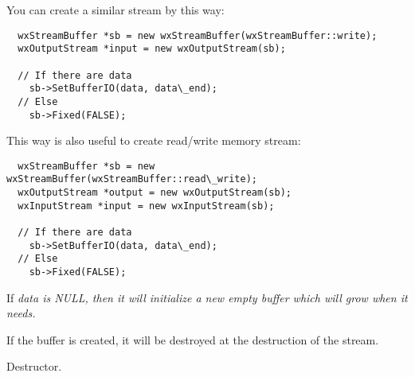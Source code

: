 
You can create a similar stream by this way:
\begin{verbatim}
  wxStreamBuffer *sb = new wxStreamBuffer(wxStreamBuffer::write);
  wxOutputStream *input = new wxOutputStream(sb);

  // If there are data
    sb->SetBufferIO(data, data\_end);
  // Else
    sb->Fixed(FALSE);
\end{verbatim}

This way is also useful to create read/write memory stream:
\begin{verbatim}
  wxStreamBuffer *sb = new wxStreamBuffer(wxStreamBuffer::read\_write);
  wxOutputStream *output = new wxOutputStream(sb);
  wxInputStream *input = new wxInputStream(sb);

  // If there are data
    sb->SetBufferIO(data, data\_end);
  // Else
    sb->Fixed(FALSE);
\end{verbatim}




If \it{data} is NULL, then it will initialize a new empty buffer which will
grow when it needs.


If the buffer is created, it will be destroyed at the destruction of the
stream.



Destructor.
